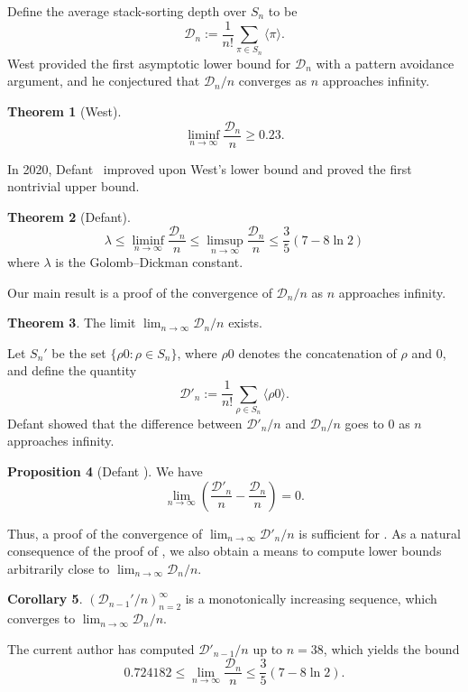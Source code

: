 \documentclass[12pt]{amsart}
\newcommand{\met}[1]{\langle #1\rangle}
\theoremstyle{definition}
\newtheorem{theorem}{Theorem}[section]
\newtheorem{corollary}[theorem]{Corollary}
\newtheorem{proposition}[theorem]{Proposition}
\begin{document}
Define the average stack-sorting depth over $S_n$ to be
\[\mathcal{D}_n:=\frac{1}{n!}\sum_{\pi\in S_n} \met{\pi}.\]
West \cite{west} provided the first asymptotic lower bound for $\mathcal{D}_n$ with a pattern avoidance argument, and he conjectured that $\mathcal{D}_n/n$ converges as $n$ approaches infinity.
\begin{theorem}[West]
\[\liminf_{n\to\infty}\frac{\mathcal{D}_n}{n}\ge 0.23.\]
\end{theorem}
In 2020, Defant~\cite{defant2} improved upon West's lower bound and proved the first nontrivial upper bound.
\begin{theorem}[Defant]
\[\lambda\le \liminf_{n\to\infty}\frac{\mathcal{D}_n}{n}\le \limsup_{n\to\infty}\frac{\mathcal{D}_n}{n}\le \frac{3}{5}(7-8\ln 2)\]
where $\lambda$ is the Golomb--Dickman constant.
\end{theorem}
Our main result is a proof of the convergence of $\mathcal{D}_n/n$ as $n$ approaches infinity.  

\begin{theorem}\label{thm:main}
The limit $\lim_{n\to\infty}\mathcal{D}_n/n$ exists.
\end{theorem}

Let $S_n'$ be the set $\{\rho0:\rho\in S_n\}$, where $\rho0$ denotes the concatenation of $\rho$ and $0$, and define the quantity
\[\mathcal{D}'_n := \frac{1}{n!}\sum_{\rho\in S_n}\met{\rho0}.\]
Defant\cite{defant2} showed that the difference between $\mathcal{D}'_n/n$ and $\mathcal{D}_n/n$ goes to $0$ as $n$ approaches infinity. 
\begin{proposition}[{Defant \cite[Proposition~2.9]{defant2}}]\label{prop:defant}
We have
\[\lim_{n\to \infty}\left(\frac{\mathcal{D}'_n}{n}-\frac{\mathcal{D}_n}{n}\right) = 0.\]
\end{proposition}
Thus, a proof of the convergence of $\lim_{n\to\infty}\mathcal{D}'_n/n$ is sufficient for . As a natural consequence of the proof of , we also obtain a means to compute lower bounds arbitrarily close to $\lim_{n\to\infty}\mathcal{D}_{n}/n$.
\begin{corollary}\label{cor:lb}
$(\mathcal{D}_{n-1}'/n)_{n=2}^{\infty}$ is a monotonically increasing sequence, which converges to $\lim_{n\to\infty}\mathcal{D}_n/n$.
\end{corollary}

The current author has computed $\mathcal{D}'_{n-1}/n$ up to $n=38$, which yields the bound
\[0.724182\le \lim_{n\to\infty}\frac{\mathcal{D}_n}{n}\le \frac{3}{5}(7-8\ln 2).\]
\end{document}
